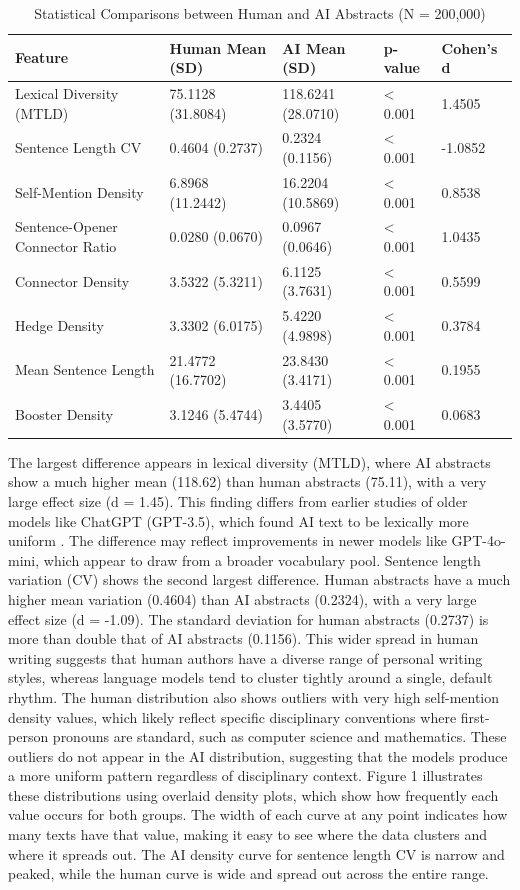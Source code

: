 \documentclass{article}
\begin{document}
\begin{table}[H]
\centering
\small
\begin{tabular}{lllll}
\toprule
\textbf{Feature} & \textbf{Human Mean (SD)} & \textbf{AI Mean (SD)} & \textbf{p-value} & \textbf{Cohen's d} \\
\midrule
Lexical Diversity (MTLD) & 75.1128 (31.8084) & 118.6241 (28.0710) & < 0.001 & 1.4505 \\
Sentence Length CV & 0.4604 (0.2737) & 0.2324 (0.1156) & < 0.001 & -1.0852 \\
Self-Mention Density & 6.8968 (11.2442) & 16.2204 (10.5869) & < 0.001 & 0.8538 \\
Sentence-Opener Connector Ratio & 0.0280 (0.0670) & 0.0967 (0.0646) & < 0.001 & 1.0435 \\
Connector Density & 3.5322 (5.3211) & 6.1125 (3.7631) & < 0.001 & 0.5599 \\
Hedge Density & 3.3302 (6.0175) & 5.4220 (4.9898) & < 0.001 & 0.3784 \\
Mean Sentence Length & 21.4772 (16.7702) & 23.8430 (3.4171) & < 0.001 & 0.1955 \\
Booster Density & 3.1246 (5.4744) & 3.4405 (3.5770) & < 0.001 & 0.0683 \\
\bottomrule
\end{tabular}
\caption{Statistical Comparisons between Human and AI Abstracts (N = 200,000)}
\end{table}

The largest difference appears in lexical diversity (MTLD), where AI abstracts show a much higher mean (118.62) than human abstracts (75.11), with a very large effect size (d = 1.45). This finding differs from earlier studies of older models like ChatGPT (GPT-3.5), which found AI text to be lexically more uniform \cite{ref5}. The difference may reflect improvements in newer models like GPT-4o-mini, which appear to draw from a broader vocabulary pool. Sentence length variation (CV) shows the second largest difference. Human abstracts have a much higher mean variation (0.4604) than AI abstracts (0.2324), with a very large effect size (d = -1.09). The standard deviation for human abstracts (0.2737) is more than double that of AI abstracts (0.1156). This wider spread in human writing suggests that human authors have a diverse range of personal writing styles, whereas language models tend to cluster tightly around a single, default rhythm. The human distribution also shows outliers with very high self-mention density values, which likely reflect specific disciplinary conventions where first-person pronouns are standard, such as computer science and mathematics. These outliers do not appear in the AI distribution, suggesting that the models produce a more uniform pattern regardless of disciplinary context. Figure 1 illustrates these distributions using overlaid density plots, which show how frequently each value occurs for both groups. The width of each curve at any point indicates how many texts have that value, making it easy to see where the data clusters and where it spreads out. The AI density curve for sentence length CV is narrow and peaked, while the human curve is wide and spread out across the entire range.
\end{document}
